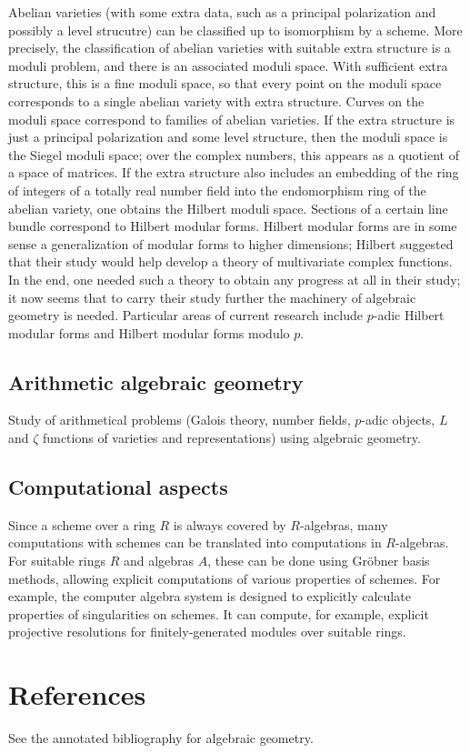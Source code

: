 \documentclass[12pt]{article}
\newcommand{\sect}[1]{\clearpage\section*{#1}}
\begin{document}
Abelian varieties (with some extra data, such as a principal polarization and possibly a level strucutre) can be classified up to isomorphism by a scheme.   More precisely, the classification of abelian varieties with suitable extra structure is a moduli problem, and there is an associated moduli space.  With sufficient extra structure, this is a fine moduli space, so that every point on the moduli space corresponds to a single abelian variety with extra structure.  Curves on the moduli space correspond to families of abelian varieties.  If the extra structure is just a principal polarization and some level structure, then the moduli space is the Siegel moduli space; over the complex numbers, this appears as a quotient of a space of matrices.  If the extra structure also includes an embedding of the ring of integers of a totally real number field into the endomorphism ring of the abelian variety, one obtains the Hilbert moduli space.  Sections of a certain line bundle correspond to Hilbert modular forms.  Hilbert modular forms are in some sense a generalization of modular forms to higher dimensions; Hilbert suggested that their study would help develop a theory of multivariate complex functions.  In the end, one needed such a theory to obtain any progress at all in their study; it now seems that to carry their study further the machinery of algebraic geometry is needed.  Particular areas of current research include $p$-adic Hilbert modular forms and Hilbert modular forms modulo $p$.

\subsection*{Arithmetic algebraic geometry}

Study of arithmetical problems (Galois theory, number fields, $p$-adic objects, $L$ and $\zeta$ functions of varieties and representations) using algebraic geometry. 

\subsection*{Computational aspects}

Since a scheme over a ring $R$ is always covered by $R$-algebras, many computations with schemes can be translated into computations in $R$-algebras.  For suitable rings $R$ and algebras $A$, these can be done using Gr\"obner basis methods, allowing explicit computations of various properties of schemes.  For example, the computer algebra system  is designed to explicitly calculate properties of singularities on schemes.  It can compute, for example, explicit projective resolutions for finitely-generated modules over suitable rings. 

\sect{References}

See the annotated bibliography for algebraic geometry.
\end{document}
